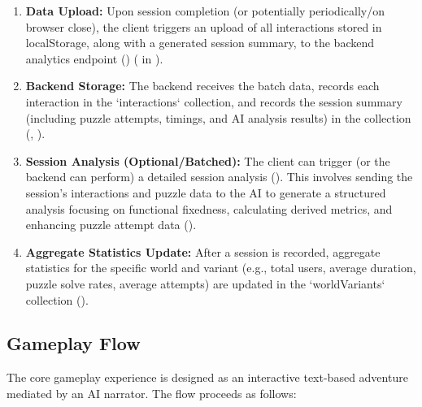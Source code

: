 \documentclass{article}
\begin{document}
\begin{enumerate}
    \item \textbf{Data Upload:} Upon session completion (or potentially periodically/on browser close), the client triggers an upload of all interactions stored in localStorage, along with a generated session summary, to the backend analytics endpoint () ( in ).
    \item \textbf{Backend Storage:} The backend receives the batch data, records each interaction in the `interactions` collection, and records the session summary (including puzzle attempts, timings, and AI analysis results) in the \texttt{} collection (, ).
    \item \textbf{Session Analysis (Optional/Batched):} The client can trigger (or the backend can perform) a detailed session analysis (). This involves sending the session's interactions and puzzle data to the AI to generate a structured analysis focusing on functional fixedness, calculating derived metrics, and enhancing puzzle attempt data ().
    \item \textbf{Aggregate Statistics Update:} After a session is recorded, aggregate statistics for the specific world and variant (e.g., total users, average duration, puzzle solve rates, average attempts) are updated in the `worldVariants` collection ().
\end{enumerate}

\subsection{Gameplay Flow}
The core gameplay experience is designed as an interactive text-based adventure mediated by an AI narrator. The flow proceeds as follows:
\end{document}
